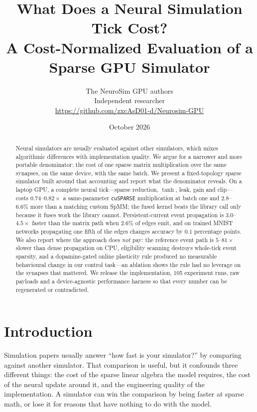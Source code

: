 \documentclass[11pt]{article}
\title{What Does a Neural Simulation Tick Cost?\\
\large A Cost-Normalized Evaluation of a Sparse GPU Simulator}
\author{The NeuroSim GPU authors\\
\small Independent researcher\\
\small \url{https://github.com/zxcAsD01-d/Neurosim-GPU}}
\date{October 2026}
\begin{document}
\maketitle

\begin{abstract}
Neural simulators are usually evaluated against other simulators, which mixes
algorithmic differences with implementation quality. We argue for a narrower and
more portable denominator: the cost of one sparse matrix multiplication over the
same synapses, on the same device, with the same batch. We present a
fixed-topology sparse simulator built around that accounting and report what the
denominator reveals. On a laptop GPU, a complete neural tick---sparse reduction,
$\tanh$, leak, gain and clip---costs $0.74$--$0.82\times$ a same-parameter
\texttt{cuSPARSE} multiplication at batch one and $2.8$--$6.6\%$ more than a
matching custom SpMM; the fused kernel beats the library call only because it
fuses work the library cannot. Persistent-current event propagation is
$3.0$--$4.5\times$ faster than the matrix path when $2.6\%$ of edges emit, and on
trained MNIST networks propagating one fifth of the edges changes accuracy by
$0.1$ percentage points. We also report where the approach does \emph{not} pay:
the reference event path is $5$--$81\times$ slower than dense propagation on CPU,
eligibility scanning destroys whole-tick event sparsity, and a dopamine-gated
online plasticity rule produced no measurable behavioural change in our control
task---an ablation shows the rule had no leverage on the synapses that mattered.
We release the implementation, 105 experiment runs, raw payloads and a
device-agnostic performance harness so that every number can be regenerated or
contradicted.
\end{abstract}

\section{Introduction}

Simulation papers usually answer ``how fast is your simulator?'' by comparing
against another simulator. That comparison is useful, but it confounds three
different things: the cost of the sparse linear algebra the model requires, the
cost of the neural update around it, and the engineering quality of the
implementation. A simulator can win the comparison by being faster at sparse
math, or lose it for reasons that have nothing to do with the model.
\end{document}
